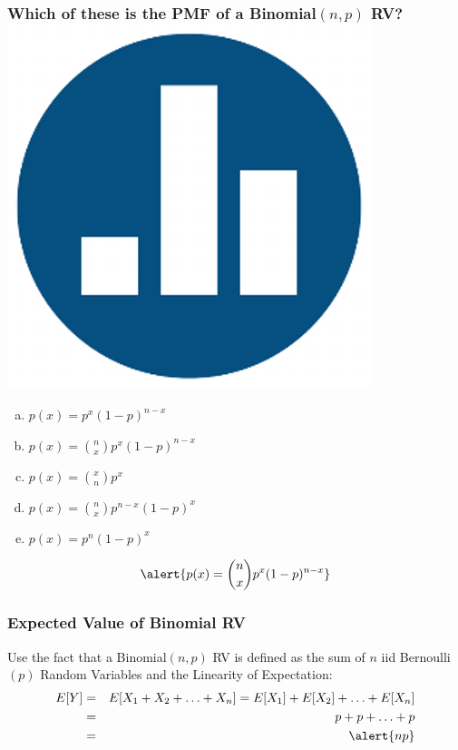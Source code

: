 \documentclass[handout]{beamer}
\begin{document}
\begin{frame}
\frametitle{Which of these is the PMF of a Binomial$(n,p)$ RV? \hfill \includegraphics[scale = 0.05]{./images/clicker}}

\begin{enumerate}[(a)]
	\item $p(x) = p^x (1-p)^{n-x}$
	\item $p(x) = {n \choose x} p^x (1-p)^{n-x}$
	\item $p(x) = {x \choose n} p^x$
	\item $p(x) = {n \choose x} p^{n-x} (1-p)^{x}$
	\item $p(x) = p^n (1-p)^{x}$
\end{enumerate}

\pause
 
$$\alert{p(x) = {n \choose x} p^x (1-p)^{n-x}}$$ 



\end{frame}
\begin{frame}
\frametitle{Expected Value of Binomial RV}

Use the fact that a Binomial$(n,p)$ RV is defined as the sum of $n$ iid Bernoulli$(p)$ Random Variables and the Linearity of Expectation:
\begin{eqnarray*}
E[Y] &=& E[X_1 + X_2 + \hdots + X_n] =  E[X_1] + E[X_2] + \hdots +E[X_n]\\
	&=& p + p + \hdots + p\\
	&=&  \alert{np}
\end{eqnarray*}
\vspace{3em}
\end{frame}
\end{document}

